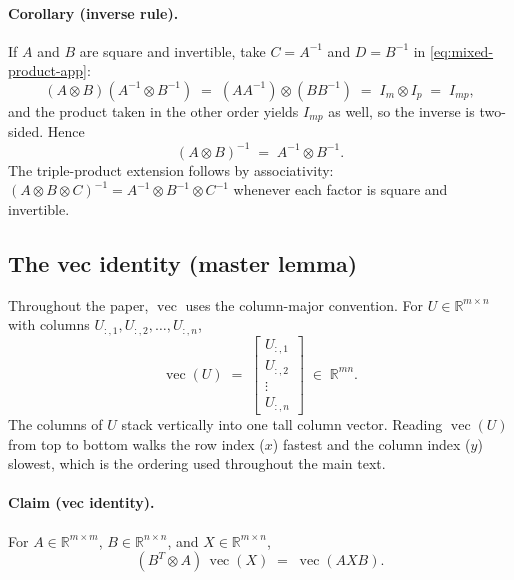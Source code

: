 \documentclass[11pt]{article}
\newcommand{\kron}{\otimes}
\newcommand{\R}{\mathbb{R}}
\newcommand{\vect}{\operatorname{vec}}
\begin{document}
\begin{appendices}
\paragraph{Corollary (inverse rule).}
If $A$ and $B$ are square and invertible, take $C = A^{-1}$ and
$D = B^{-1}$ in \eqref{eq:mixed-product-app}:
\begin{equation*}
  (A \kron B)(A^{-1} \kron B^{-1})
  \;=\; (A A^{-1}) \kron (B B^{-1})
  \;=\; I_m \kron I_p
  \;=\; I_{mp},
\end{equation*}
and the product taken in the other order yields $I_{mp}$ as well, so
the inverse is two-sided.  Hence
\begin{equation}
\label{eq:kron-inv-app}
  (A \kron B)^{-1} \;=\; A^{-1} \kron B^{-1}.
\end{equation}
The triple-product extension follows by associativity:
$(A \kron B \kron C)^{-1} = A^{-1} \kron B^{-1} \kron C^{-1}$
whenever each factor is square and invertible.

\subsection{The vec identity (master lemma)}
\label{app:vec-identity}

Throughout the paper, $\vect$ uses the column-major convention.  For
$U \in \R^{m \times n}$ with columns $U_{:,1}, U_{:,2}, \ldots, U_{:,n}$,
\begin{equation}
\label{eq:vec-def}
  \vect(U)
  \;=\;
  \begin{bmatrix}
    U_{:,1} \\[2pt]
    U_{:,2} \\[2pt]
    \vdots \\[2pt]
    U_{:,n}
  \end{bmatrix}
  \;\in\; \R^{mn}.
\end{equation}
The columns of $U$ stack vertically into one tall column vector.
Reading $\vect(U)$ from top to bottom walks the row index ($x$)
fastest and the column index ($y$) slowest, which is the ordering
used throughout the main text.

\paragraph{Claim (vec identity).}
For $A \in \R^{m \times m}$, $B \in \R^{n \times n}$, and
$X \in \R^{m \times n}$,
\begin{equation}
\label{eq:vec-identity}
  \boxed{\,(B^T \kron A)\,\vect(X) \;=\; \vect(A X B).\,}
\end{equation}


\end{appendices}
\end{document}
